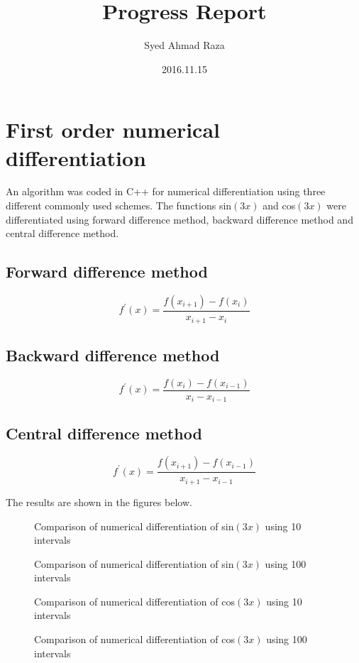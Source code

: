 \documentclass[12pt,a4paper,fleqn]{article}
\title{Progress Report}
\author{Syed Ahmad Raza}
\date{2016.11.15}
\begin{document}
	\maketitle
		\section*{First order numerical differentiation}
		An algorithm was coded in C++ for numerical differentiation using three different commonly used schemes. The functions sin$(3x)$ and cos$(3x)$ were differentiated using forward difference method, backward difference method and central difference method.
		
			\subsection*{Forward difference method}
			\begin{equation}
			f^\prime(x) = \frac{f(x_{i+1})-f(x_i)}{x_{i+1}-x_i}
			\end{equation}
			
			\subsection*{Backward difference method}
			\begin{equation}
			f^\prime(x) = \frac{f(x_i)-f(x_{i-1})}{x_i-x_{i-1}}
			\end{equation}
			
			\subsection*{Central difference method}
			\begin{equation}
			f^\prime(x) = \frac{f(x_{i+1})-f(x_{i-1})}{x_{i+1}-x_{i-1}}
			\end{equation}
		
		The results are shown in the figures below.
		\begin{figure}
			\centering
			
			\caption{Comparison of numerical differentiation of sin$(3x)$ using 10 intervals}
		\end{figure}
		\begin{figure}
			\centering
			
			\caption{Comparison of numerical differentiation of sin$(3x)$ using 100 intervals}
		\end{figure}
		\begin{figure}
			\centering
			
			\caption{Comparison of numerical differentiation of cos$(3x)$ using 10 intervals}
		\end{figure}
		\begin{figure}
			\centering
			
			\caption{Comparison of numerical differentiation of cos$(3x)$ using 100 intervals}
		\end{figure}
\end{document}
